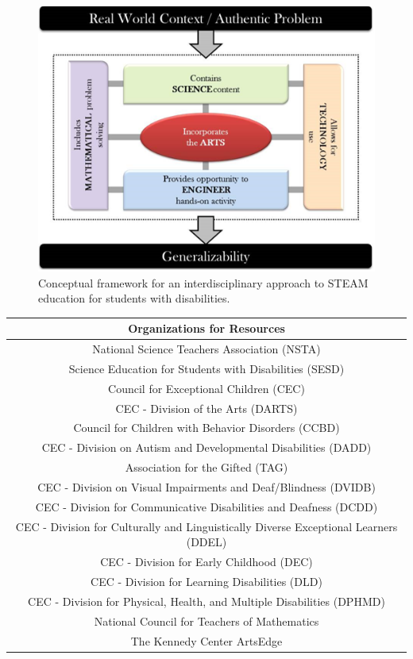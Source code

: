 \documentclass[11.5pt]{sig-alternate} %
\begin{document}
\begin{large}
 \begin{figure}[thbp]
     \centering
     \includegraphics[width=1\linewidth]{fig3.png}
     \caption{Conceptual framework for an interdisciplinary approach to STEAM education for students with disabilities.}
 \end{figure}

\begin{table}[h]
\begin{tabular}{|c|}
\hline
Organizations for Resources \\ \hline
National Science Teachers Association (NSTA) \\ \hline
Science Education for Students with Disabilities (SESD) \\ \hline
Council for Exceptional Children (CEC) \\ \hline
CEC - Division of the Arts (DARTS) \\ \hline
Council for Children with Behavior Disorders (CCBD) \\ \hline
CEC - Division on Autism and Developmental Disabilities (DADD) \\ \hline
Association for the Gifted (TAG) \\ \hline
CEC - Division on Visual Impairments and Deaf/Blindness (DVIDB) \\ \hline
CEC - Division for Communicative Disabilities and Deafness (DCDD) \\ \hline
CEC - Division for Culturally and Linguistically Diverse Exceptional Learners (DDEL) \\ \hline
CEC - Division for Early Childhood (DEC) \\ \hline
CEC - Division for Learning Disabilities (DLD) \\ \hline
CEC - Division for Physical, Health, and Multiple Disabilities (DPHMD) \\ \hline
National Council for Teachers of Mathematics \\ \hline
The Kennedy Center ArtsEdge \\ \hline
\end{tabular}
\end{table}


\end{large}
\end{document}
